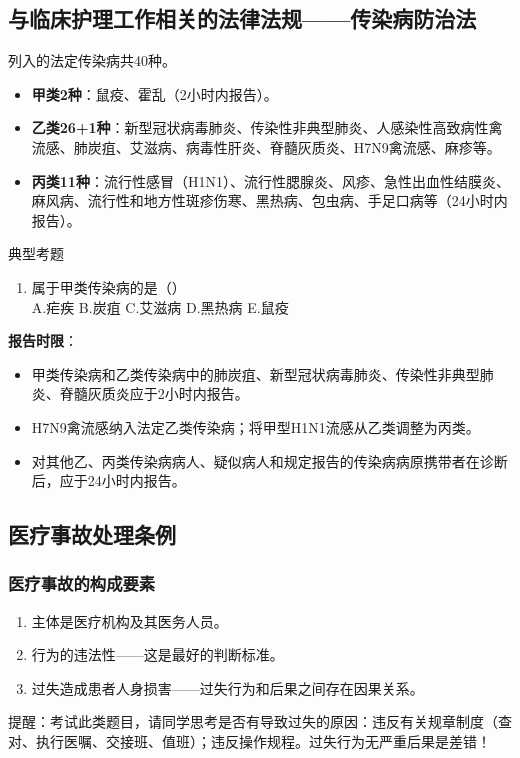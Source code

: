 \documentclass[11pt, a4paper]{ctexart}
\begin{document}
\subsection{与临床护理工作相关的法律法规——传染病防治法}
列入的法定传染病共40种。
\begin{itemize}
	\item \textbf{甲类2种}：鼠疫、霍乱（2小时内报告）。
	\item \textbf{乙类26+1种}：新型冠状病毒肺炎、传染性非典型肺炎、人感染性高致病性禽流感、肺炭疽、艾滋病、病毒性肝炎、脊髓灰质炎、H7N9禽流感、麻疹等。
	\item \textbf{丙类11种}：流行性感冒（H1N1）、流行性腮腺炎、风疹、急性出血性结膜炎、麻风病、流行性和地方性斑疹伤寒、黑热病、包虫病、手足口病等（24小时内报告）。
\end{itemize}

\begin{examplebox}{典型考题}
	\begin{enumerate}
		\item 属于甲类传染病的是（\qquad）\\
		      A.疟疾 \quad B.炭疽 \quad C.艾滋病 \quad D.黑热病 \quad E.鼠疫
	\end{enumerate}
\end{examplebox}

\textbf{报告时限}：
\begin{itemize}
	\item 甲类传染病和乙类传染病中的肺炭疽、新型冠状病毒肺炎、传染性非典型肺炎、脊髓灰质炎应于2小时内报告。
	\item H7N9禽流感纳入法定乙类传染病；将甲型H1N1流感从乙类调整为丙类。
	\item 对其他乙、丙类传染病病人、疑似病人和规定报告的传染病病原携带者在诊断后，应于24小时内报告。
\end{itemize}

\subsection{医疗事故处理条例}
\subsubsection{医疗事故的构成要素}
\begin{enumerate}
	\item 主体是医疗机构及其医务人员。
	\item 行为的违法性——这是最好的判断标准。
	\item 过失造成患者人身损害——过失行为和后果之间存在因果关系。
\end{enumerate}
提醒：考试此类题目，请同学思考是否有导致过失的原因：违反有关规章制度（查对、执行医嘱、交接班、值班）；违反操作规程。过失行为无严重后果是差错！
\end{document}
